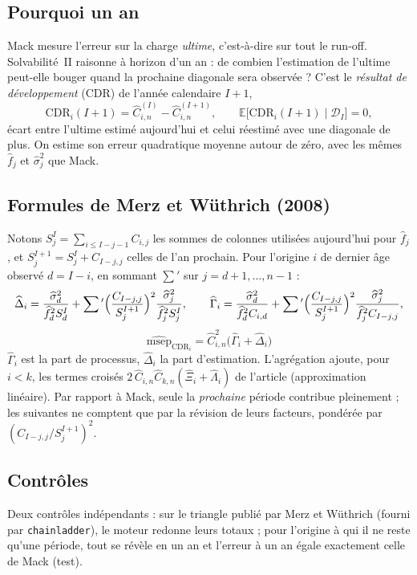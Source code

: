 \documentclass[11pt,a4paper]{article}
\begin{document}
\subsection*{Pourquoi un an}
Mack mesure l'erreur sur la charge \emph{ultime}, c'est-à-dire sur tout le run-off. Solvabilité~II raisonne à horizon d'un an : de combien l'estimation de l'ultime peut-elle bouger quand la prochaine diagonale sera observée ? C'est le \emph{résultat de développement} (CDR) de l'année calendaire $I+1$,
\[
\mathrm{CDR}_i(I+1)=\widehat C_{i,n}^{(I)}-\widehat C_{i,n}^{(I+1)},\qquad \mathbb E\bigl[\mathrm{CDR}_i(I+1)\mid\mathcal D_I\bigr]=0,
\]
écart entre l'ultime estimé aujourd'hui et celui réestimé avec une diagonale de plus. On estime son erreur quadratique moyenne autour de zéro, avec les mêmes $\widehat f_j$ et $\widehat\sigma_j^2$ que Mack.

\subsection*{Formules de Merz et Wüthrich (2008)}
Notons $S_j^{I}=\sum_{i\le I-j-1}C_{i,j}$ les sommes de colonnes utilisées aujourd'hui pour $\widehat f_j$, et $S_j^{I+1}=S_j^I+C_{I-j,j}$ celles de l'an prochain. Pour l'origine $i$ de dernier âge observé $d=I-i$, en sommant $\sum'$ sur $j=d+1,\dots,n-1$ :
\[
\widehat\Delta_i=\frac{\widehat\sigma_d^2}{\widehat f_d^2S_d^I}+\sum{}'\Bigl(\frac{C_{I-j,j}}{S_j^{I+1}}\Bigr)^2\frac{\widehat\sigma_j^2}{\widehat f_j^2S_j^I},\qquad
\widehat\Gamma_i=\frac{\widehat\sigma_d^2}{\widehat f_d^2C_{i,d}}+\sum{}'\Bigl(\frac{C_{I-j,j}}{S_j^{I+1}}\Bigr)^2\frac{\widehat\sigma_j^2}{\widehat f_j^2C_{I-j,j}},
\]
\[
\boxed{\widehat{\mathrm{msep}}_{\mathrm{CDR}_i}=\widehat C_{i,n}^2\bigl(\widehat\Gamma_i+\widehat\Delta_i\bigr)}
\]
$\widehat\Gamma_i$ est la part de processus, $\widehat\Delta_i$ la part d'estimation. L'agrégation ajoute, pour $i<k$, les termes croisés $2\,\widehat C_{i,n}\widehat C_{k,n}(\widehat\Xi_i+\widehat\Lambda_i)$ de l'article (approximation linéaire). Par rapport à Mack, seule la \emph{prochaine} période contribue pleinement ; les suivantes ne comptent que par la révision de leurs facteurs, pondérée par $(C_{I-j,j}/S_j^{I+1})^2$.

\subsection*{Contrôles}
Deux contrôles indépendants : sur le triangle publié par Merz et Wüthrich (fourni par \texttt{chainladder}), le moteur redonne leurs totaux ; pour l'origine à qui il ne reste qu'une période, tout se révèle en un an et l'erreur à un an égale exactement celle de Mack (test).
\begin{table}[H]\centering\small
\tabMWCheck
\caption{Reproduction des valeurs publiées par Merz et Wüthrich (2008).}
\end{table}
\end{document}
